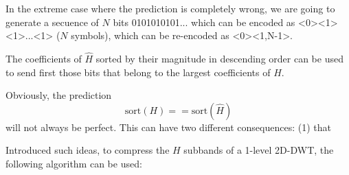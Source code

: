 In the extreme case where the prediction is completely wrong, we are
going to generate a secuence of $N$ bits 0101010101... which can be
encoded as <0><1><1>...<1> ($N$ symbols), which can be re-encoded as
<0><1,N-1>.


The coefficients of $\hat{H}$ sorted by their magnitude in descending
order can be used to send first those bits that belong to the largest
coefficients of $H$.

Obviously, the prediction
\begin{equation}
  \text{sort}(H)==\text{sort}(\hat{H})
\end{equation}
will not always be perfect. This can have two different consequences: (1) that 

Introduced such ideas, to compress the $H$ subbands of a 1-level
2D-DWT, the following algorithm can be used:

